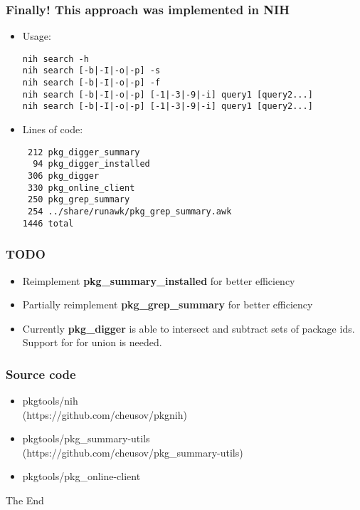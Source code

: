 \documentclass[hyperref=unicode,ascii,xcolor=dvipsnames]{beamer}
\begin{document}
\begin{frame}[fragile]
  \frametitle{Finally! This approach was implemented in NIH}
  \begin{itemize}
  \item Usage:
\begin{verbatim}
nih search -h
nih search [-b|-I|-o|-p] -s
nih search [-b|-I|-o|-p] -f
nih search [-b|-I|-o|-p] [-1|-3|-9|-i] query1 [query2...]
nih search [-b|-I|-o|-p] [-1|-3|-9|-i] query1 [query2...]
\end{verbatim}
\item Lines of code:
\begin{verbatim}
 212 pkg_digger_summary
  94 pkg_digger_installed
 306 pkg_digger
 330 pkg_online_client
 250 pkg_grep_summary
 254 ../share/runawk/pkg_grep_summary.awk
1446 total
\end{verbatim}
  \end{itemize}
\end{frame}

\begin{frame}[fragile]
  \frametitle{TODO}
  \begin{itemize}
  \item Reimplement {\bf pkg\_summary\_installed} for better efficiency
  \item Partially reimplement {\bf pkg\_grep\_summary} for better efficiency
  \item Currently {\bf pkg\_digger} is able to intersect and subtract sets of package ids.
    Support for for union is needed.
  \end{itemize}
\end{frame}

\begin{frame}[fragile]
  \frametitle{Source code}
  \begin{itemize}
  \item pkgtools/nih\\
    (https://github.com/cheusov/pkgnih)
  \item pkgtools/pkg\_summary-utils\\
    (https://github.com/cheusov/pkg\_summary-utils)
  \item pkgtools/pkg\_online-client
  \end{itemize}
  \begin{center}
    \Huge{The End}
  \end{center}
\end{frame}

\end{document}
